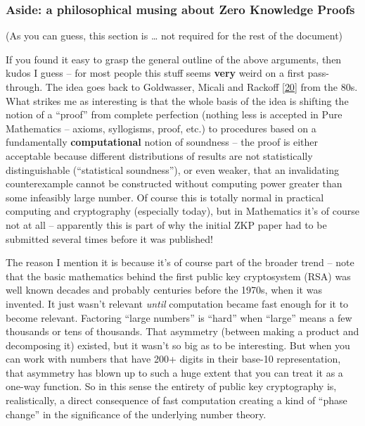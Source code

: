 \documentclass[10pt,a4paper]{article}
\begin{document}
\hypertarget{aside-a-philosophical-musing-about-zero-knowledge-proofs}{%
\subsubsection[Aside: a philosophical musing about Zero Knowledge
Proofs]{\texorpdfstring{\protect\hypertarget{anchor-32}{}{}Aside: a
philosophical musing about Zero Knowledge
Proofs}{Aside: a philosophical musing about Zero Knowledge Proofs}}\label{aside-a-philosophical-musing-about-zero-knowledge-proofs}}

(As you can guess, this section is \ldots{} not required for the rest of
the document)

If you found it easy to grasp the general outline of the above
arguments, then kudos I guess -- for most people this stuff seems
\textbf{very} weird on a first pass-through. The idea goes back to
Goldwasser, Micali and Rackoff {[}\protect\hyperlink{anchor-33}{20}{]}
from the 80s. What strikes me as interesting is that the whole basis of
the idea is shifting the notion of a ``proof'' from complete perfection
(nothing less is accepted in Pure Mathematics -- axioms, syllogisms,
proof, etc.) to procedures based on a fundamentally
\textbf{computational} notion of soundness -- the proof is either
acceptable because different distributions of results are not
statistically distinguishable (``statistical soundness''), or even
weaker, that an invalidating counterexample cannot be constructed
without computing power greater than some infeasibly large number. Of
course this is totally normal in practical computing and cryptography
(especially today), but in Mathematics it's of course not at all --
apparently this is part of why the initial ZKP paper had to be submitted
several times before it was published!

The reason I mention it is because it's of course part of the broader
trend -- note that the basic mathematics behind the first public key
cryptosystem (RSA) was well known decades and probably centuries before
the 1970s, when it was invented. It just wasn't relevant \emph{until}
computation became fast enough for it to become relevant. Factoring
``large numbers'' is ``hard'' when ``large'' means a few thousands or
tens of thousands. That asymmetry (between making a product and
decomposing it) existed, but it wasn't so big as to be interesting. But
when you can work with numbers that have 200+ digits in their base-10
representation, that asymmetry has blown up to such a huge extent that
you can treat it as a one-way function. So in this sense the entirety of
public key cryptography is, realistically, a direct consequence of fast
computation creating a kind of ``phase change'' in the significance of
the underlying number theory.
\end{document}
